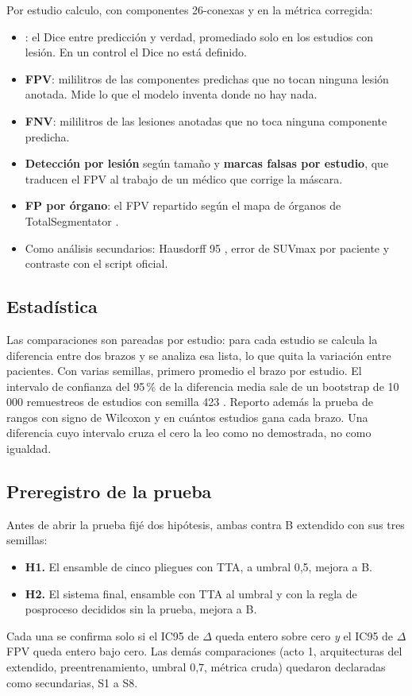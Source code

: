 Por estudio calculo, con componentes 26-conexas y en la métrica corregida:
\begin{itemize}
\item \textbf{\dmas}: el Dice entre predicción y verdad, promediado solo en los estudios con lesión. En un control el Dice no está definido.
\item \textbf{FPV}: mililitros de las componentes predichas que no tocan ninguna lesión anotada. Mide lo que el modelo inventa donde no hay nada.
\item \textbf{FNV}: mililitros de las lesiones anotadas que no toca ninguna componente predicha.
\item \textbf{Detección por lesión} según tamaño y \textbf{marcas falsas por estudio}, que traducen el FPV al trabajo de un médico que corrige la máscara.
\item \textbf{FP por órgano}: el FPV repartido según el mapa de órganos de TotalSegmentator \citep{wasserthal2023}.
\item Como análisis secundarios: Hausdorff 95 \citep{maierhein2024}, error de SUVmax por paciente y contraste con el script oficial.
\end{itemize}

\subsection{Estadística}

Las comparaciones son pareadas por estudio: para cada estudio se calcula la diferencia entre dos brazos y se analiza esa lista, lo que quita la variación entre pacientes. Con varias semillas, primero promedio el brazo por estudio. El intervalo de confianza del 95\,\% de la diferencia media sale de un bootstrap de 10\,000 remuestreos de estudios con semilla 423 \citep{efron1993}. Reporto además la prueba de rangos con signo de Wilcoxon y en cuántos estudios gana cada brazo. Una diferencia cuyo intervalo cruza el cero la leo como no demostrada, no como igualdad.

\subsection{Preregistro de la prueba}
\label{sec:umbral}

Antes de abrir la prueba fijé dos hipótesis, ambas contra B extendido con sus tres semillas:
\begin{itemize}
\item \textbf{H1.} El ensamble de cinco pliegues con TTA, a umbral 0,5, mejora a B.
\item \textbf{H2.} El sistema final, ensamble con TTA al umbral y con la regla de posproceso decididos sin la prueba, mejora a B.
\end{itemize}
Cada una se confirma solo si el IC95 de $\Delta$\dmas{} queda entero sobre cero \emph{y} el IC95 de $\Delta$FPV queda entero bajo cero. Las demás comparaciones (acto 1, arquitecturas del extendido, preentrenamiento, umbral 0,7, métrica cruda) quedaron declaradas como secundarias, S1 a S8.

